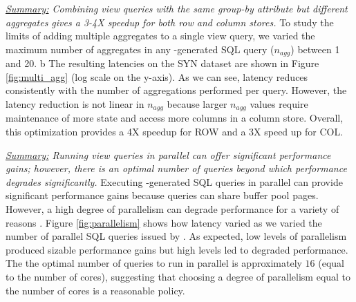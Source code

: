 {\em \underline{Summary:} Com\-bining 
view quer\-ies with the same group-by attribute
but different aggregates gives a 
3-4X speedup for both row and column stores.}
To study the limits of adding multiple aggregates to a single view query, we
varied the maximum number of aggregates in any \SeeDB-generated SQL query 
($n_{agg}$) between 1 and 20.
b%
The resulting latencies on the SYN dataset are shown in Figure \ref{fig:multi_agg} (log scale on the y-axis).
As we can see, latency reduces consistently with the number of aggregations performed 
per query.
However, the latency reduction is not linear in $n_{agg}$ because
larger $n_{agg}$ values require maintenance of more state and access more columns in a 
column store.
Overall, this optimization provides a 4X speedup for ROW and a 3X speed up for COL.

{\em \underline{Summary:} Running view queries in parallel can offer significant
performance gains; however, there is an optimal number of queries
beyond which performance degrades significantly.}
Executing \SeeDB-generated SQL queries in parallel can provide significant performance gains
because queries can share buffer pool pages.
However, a high degree of parallelism can degrade performance for a variety of reasons \cite{Postgres_wiki}. 
Figure \ref{fig:parallelism} shows how latency varied as we varied the number of parallel SQL queries
issued by \SeeDB.
As expected, low levels of parallelism produced sizable performance gains but
high levels led to degraded performance.  The the optimal number of queries to 
run in parallel is approximately $16$ (equal to the number of cores),
suggesting that choosing a degree of parallelism equal to the number of cores
is a reasonable policy. 


